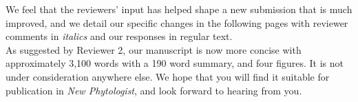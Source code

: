 \documentclass{article}[11pt]
\begin{document}
We feel that the reviewers' input has helped shape a new submission that is much improved, and we detail our specific changes in the following pages with reviewer comments in \emph{italics} and our responses in regular text.\\

As suggested by Reviewer 2, our manuscript is now more concise with approximately 3,100 words with a 190 word summary, and four figures. It is
not under consideration anywhere else. We hope that you will find it suitable for publication in \emph{New Phytologist}, and look forward to hearing from you.
\end{document}
